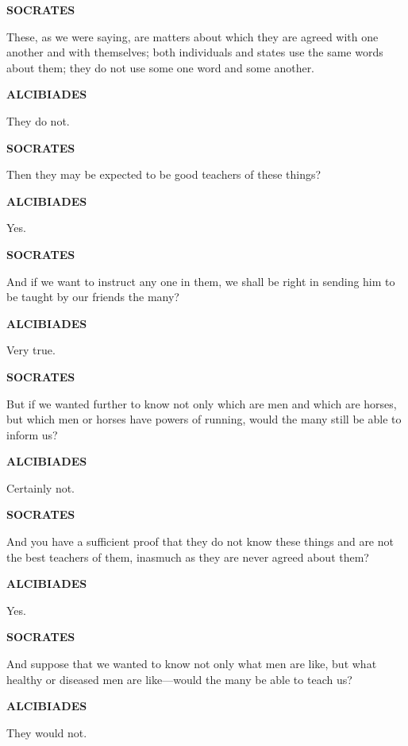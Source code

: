 \documentclass[11pt,letter]{article}
\begin{document}
\par \textbf{SOCRATES}
\par   These, as we were saying, are matters about which they are agreed with one another and with themselves; both individuals and states use the same words about them; they do not use some one word and some another.

\par \textbf{ALCIBIADES}
\par   They do not.

\par \textbf{SOCRATES}
\par   Then they may be expected to be good teachers of these things?

\par \textbf{ALCIBIADES}
\par   Yes.

\par \textbf{SOCRATES}
\par   And if we want to instruct any one in them, we shall be right in sending him to be taught by our friends the many?

\par \textbf{ALCIBIADES}
\par   Very true.

\par \textbf{SOCRATES}
\par   But if we wanted further to know not only which are men and which are horses, but which men or horses have powers of running, would the many still be able to inform us?

\par \textbf{ALCIBIADES}
\par   Certainly not.

\par \textbf{SOCRATES}
\par   And you have a sufficient proof that they do not know these things and are not the best teachers of them, inasmuch as they are never agreed about them?

\par \textbf{ALCIBIADES}
\par   Yes.

\par \textbf{SOCRATES}
\par   And suppose that we wanted to know not only what men are like, but what healthy or diseased men are like—would the many be able to teach us?

\par \textbf{ALCIBIADES}
\par   They would not.
\end{document}

